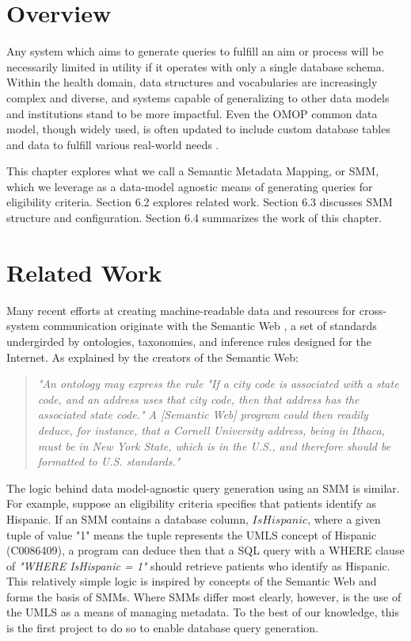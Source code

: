\documentclass[../main.tex]{subfiles}
\begin{document}
\section{Overview}

Any system which aims to generate queries to fulfill an aim or process will be necessarily limited in utility if it operates with only a single database schema. Within the health domain, data structures and vocabularies are increasingly complex and diverse, and systems capable of generalizing to other data models and institutions stand to be more impactful. Even the OMOP common data model, though widely used, is often updated to include custom database tables and data to fulfill various real-world needs \cite{belenkaya2021extending, peng2021towards, zoch2021adaption, warner2019hemonc, zhou2013evaluation, shin2019genomic, kwon2019development}. 

This chapter explores what we call a Semantic Metadata Mapping, or SMM, which we leverage as a data-model agnostic means of generating queries for eligibility criteria. Section 6.2 explores related work. Section 6.3 discusses SMM structure and configuration. Section 6.4 summarizes the work of this chapter.

\section{Related Work}

Many recent efforts at creating machine-readable data and resources for cross-system communication originate with the Semantic Web \cite{berners2001semantic}, a set of standards undergirded by ontologies, taxonomies, and inference rules designed for the Internet. As explained by the creators of the Semantic Web:

\begin{quote}
\textit{"An ontology may express the rule "If a city code is associated with a state code, and an address uses that city code, then that address has the associated state code." A [Semantic Web] program could then readily deduce, for instance, that a Cornell University address, being in Ithaca, must be in New York State, which is in the U.S., and therefore should be formatted to U.S. standards."} \cite{berners2001semantic}
\end{quote}

The logic behind data model-agnostic query generation using an SMM is similar. For example, suppose an eligibility criteria specifies that patients identify as Hispanic. If an SMM contains a database column, $IsHispanic$, where a given tuple of value "1" means the tuple represents the UMLS concept of Hispanic (C0086409), a program can deduce then that a SQL query with a WHERE clause of \textit{"WHERE IsHispanic = 1"} should retrieve patients who identify as Hispanic. This relatively simple logic is inspired by concepts of the Semantic Web and forms the basis of SMMs. Where SMMs differ most clearly, however, is the use of the UMLS as a means of managing metadata. To the best of our knowledge, this is the first project to do so to enable database query generation.
\end{document}
